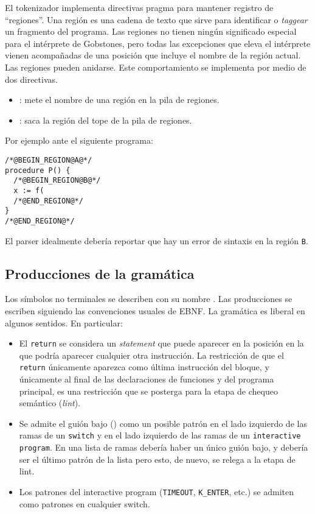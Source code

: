 \documentclass{article}
\begin{document}
El tokenizador implementa directivas pragma para
mantener registro de ``regiones''. Una regi\'on es una cadena de texto que
sirve para identificar o {\em taggear} un fragmento del programa.
Las regiones no tienen ning\'un significado
especial para el int\'erprete de Gobstones, pero todas las excepciones que
eleva el int\'erprete vienen acompa\~nadas de una posici\'on que incluye
el nombre de la regi\'on actual. Las regiones pueden anidarse.
Este comportamiento se implementa por medio de dos directivas.
\begin{itemize}
\item {}:
       mete el nombre de una regi\'on en la pila de regiones.
\item {}: saca la regi\'on del tope de la pila de regiones.
\end{itemize}
Por ejemplo ante el siguiente programa:
\begin{verbatim}
/*@BEGIN_REGION@A@*/
procedure P() {
  /*@BEGIN_REGION@B@*/
  x := f(
  /*@END_REGION@*/
}
/*@END_REGION@*/
\end{verbatim}
El parser idealmente deber\'ia reportar que hay un error de sintaxis en la regi\'on \texttt{B}.

\subsection{Producciones de la gram\'atica}

Los s\'imbolos no terminales se describen con su nombre .
Las producciones se escriben siguiendo las convenciones usuales de EBNF.
La gram\'atica es liberal en algunos sentidos. En particular:
\begin{itemize}
\item El \texttt{return}
se considera un {\em statement} que puede aparecer en la posici\'on en la que
podr\'ia aparecer cualquier otra instrucci\'on. La restricci\'on de que
el \texttt{return} \'unicamente aparezca como \'ultima instrucci\'on del bloque, y
\'unicamente al final de las declaraciones de funciones y del programa principal,
es una restricci\'on que se posterga para la etapa de chequeo sem\'antico
({\em lint}).
\item Se admite el gui\'on bajo (\chr{\_}) como un posible patr\'on en el lado
izquierdo de las ramas de un \texttt{switch} y en el lado izquierdo de las ramas de un
\texttt{interactive program}.
En una lista de ramas deber\'ia haber un \'unico gui\'on bajo, y deber\'ia ser el \'ultimo
patr\'on de la lista pero esto, de nuevo, se relega a la etapa de lint.
\item Los patrones del interactive program (\texttt{TIMEOUT}, \texttt{K\_ENTER}, etc.) se
admiten como patrones en cualquier switch.
\end{itemize}
\end{document}
